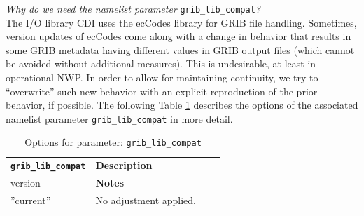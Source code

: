 \emph{Why do we need the namelist parameter} \texttt{grib\_lib\_compat}\emph{?}\\
The I/O library CDI uses the ecCodes library for GRIB file handling.
Sometimes, version updates of ecCodes come along with a change in behavior
that results in some GRIB metadata having different values in GRIB output files (which cannot be avoided without additional measures).
This is undesirable, at least in operational NWP.
In order to allow for maintaining continuity, we try to ``overwrite'' such new behavior with an explicit reproduction of the prior behavior, if possible.
The following Table \ref{tab:griblibcompat} describes the options of the associated namelist parameter \texttt{grib\_lib\_compat}
in more detail.

\begingroup
\renewcommand*{\arraystretch}{1.2}
\begin{longtable}
{|>{\raggedright}p{}   %
 |>{\raggedright}p{}   %
 |>{\raggedright}p{}   %
 |>{\raggedright}p{}|} %
\caption{Options for parameter: \texttt{grib\_lib\_compat}}\label{tab:griblibcompat}\\
\hline
\textbf{\texttt{grib\_lib\_compat}} & \textbf{Description} & \textbf{Applies to GRIB lib\\ version} & \textbf{Notes}
\tabularnewline
\hline
\endhead

''current'' & No adjustment applied. & &
\tabularnewline
%


\end{longtable}

